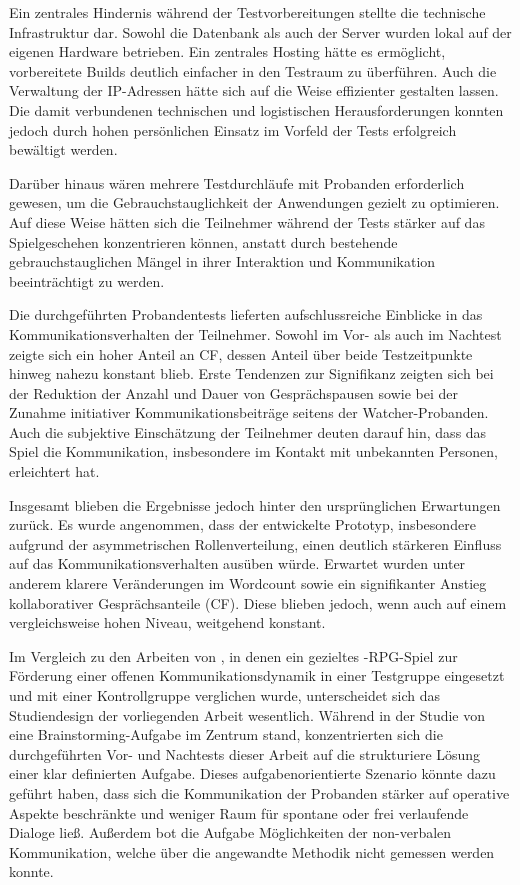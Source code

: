 Ein zentrales Hindernis während der Testvorbereitungen stellte die technische Infrastruktur dar. Sowohl die Datenbank als auch der Server wurden lokal auf der eigenen Hardware betrieben. Ein zentrales Hosting hätte es ermöglicht, vorbereitete Builds deutlich einfacher in den Testraum zu überführen. Auch die Verwaltung der IP-Adressen hätte sich auf die Weise effizienter gestalten lassen. Die damit verbundenen technischen und logistischen Herausforderungen konnten jedoch durch hohen persönlichen Einsatz im Vorfeld der Tests erfolgreich bewältigt werden.

Darüber hinaus wären mehrere Testdurchläufe mit Probanden erforderlich gewesen, um die Gebrauchstauglichkeit der Anwendungen gezielt zu optimieren. Auf diese Weise hätten sich die Teilnehmer während der Tests stärker auf das Spielgeschehen konzentrieren können, anstatt durch bestehende gebrauchstauglichen Mängel in ihrer Interaktion und Kommunikation beeinträchtigt zu werden.

Die durchgeführten Probandentests lieferten aufschlussreiche Einblicke in das Kommunikationsverhalten der Teilnehmer. Sowohl im Vor- als auch im Nachtest zeigte sich ein hoher Anteil an \ac{CF}, dessen Anteil über beide Testzeitpunkte hinweg nahezu konstant blieb. Erste Tendenzen zur Signifikanz zeigten sich bei der Reduktion der Anzahl und Dauer von Gesprächspausen sowie bei der Zunahme initiativer Kommunikationsbeiträge seitens der Watcher-Probanden. Auch die subjektive Einschätzung der Teilnehmer deuten darauf hin, dass das Spiel die Kommunikation, insbesondere im Kontakt mit unbekannten Personen, erleichtert hat.

Insgesamt blieben die Ergebnisse jedoch hinter den ursprünglichen Erwartungen zurück. Es wurde angenommen, dass der entwickelte Prototyp, insbesondere aufgrund der asymmetrischen Rollenverteilung, einen deutlich stärkeren Einfluss auf das Kommunikationsverhalten ausüben würde. Erwartet wurden unter anderem klarere Veränderungen im Wordcount sowie ein signifikanter Anstieg kollaborativer Gesprächsanteile (\ac{CF}). Diese blieben jedoch, wenn auch auf einem vergleichsweise hohen Niveau, weitgehend konstant.

Im Vergleich zu den Arbeiten von \citeauthor{nasir_effect_2015}, in denen ein gezieltes -\ac{RPG}-Spiel zur Förderung einer offenen Kommunikationsdynamik in einer Testgruppe eingesetzt und mit einer Kontrollgruppe verglichen wurde, unterscheidet sich das Studiendesign der vorliegenden Arbeit wesentlich. Während in der Studie von \citeauthor{nasir_effect_2015} eine Brainstorming-Aufgabe im Zentrum stand, konzentrierten sich die durchgeführten Vor- und Nachtests dieser Arbeit auf die strukturiere Lösung einer klar definierten Aufgabe. Dieses aufgabenorientierte Szenario könnte dazu geführt haben, dass sich die Kommunikation der Probanden stärker auf operative Aspekte beschränkte und weniger Raum für spontane oder frei verlaufende Dialoge ließ. Außerdem bot die Aufgabe Möglichkeiten der non-verbalen Kommunikation, welche über die angewandte Methodik nicht gemessen werden konnte.

